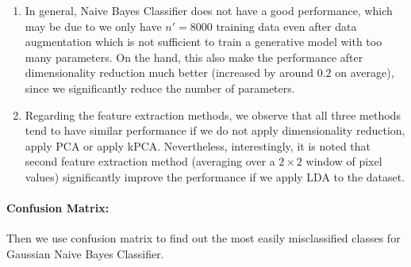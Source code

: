 \documentclass{article}
\begin{document}
\begin{enumerate}
    \item In general, Naive Bayes Classifier does not have a good performance, which may be due to we only have $n'=8000$ training data even after data augmentation which is not sufficient to train a generative model with too many parameters. On the hand, this also make the performance after dimensionality reduction much better (increased by around $0.2$ on average), since we significantly reduce the number of parameters.
    \item Regarding the feature extraction methods, we observe that all three methods tend to have similar performance if we do not apply dimensionality reduction, apply PCA or apply kPCA. Nevertheless, interestingly, it is noted that second feature extraction method (averaging over a $2 \times 2$ window of pixel values) significantly improve the performance if we apply LDA to the dataset.
\end{enumerate}

\paragraph{Confusion Matrix:}
Then we use confusion matrix to find out the most easily misclassified classes for Gaussian Naive Bayes Classifier.
\end{document}
